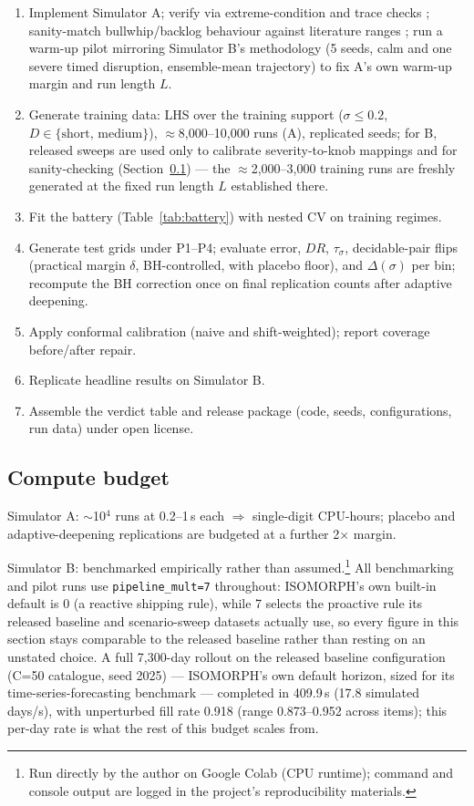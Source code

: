 \documentclass[12pt,a4paper]{article}
\begin{document}
\begin{enumerate}
\item Implement Simulator A; verify via extreme-condition and trace checks \citep{law2015}; sanity-match bullwhip/backlog behaviour against literature ranges \citep{lee1997}; run a warm-up pilot mirroring Simulator B's methodology (5 seeds, calm and one severe timed disruption, ensemble-mean trajectory) to fix A's own warm-up margin and run length $L$.
\item Generate training data: LHS over the training support ($\sigma \leq 0.2$, $D \in \{\text{short, medium}\}$), $\approx$8{,}000--10{,}000 runs (A), replicated seeds; for B, released sweeps are used only to calibrate severity-to-knob mappings and for sanity-checking (Section~\ref{sec:compute}) --- the $\approx$2{,}000--3{,}000 training runs are freshly generated at the fixed run length $L$ established there.
\item Fit the battery (Table~\ref{tab:battery}) with nested CV on training regimes.
\item Generate test grids under P1--P4; evaluate error, $DR$, $\tau_\sigma$, decidable-pair flips (practical margin $\delta$, BH-controlled, with placebo floor), and $\Delta(\sigma)$ per bin; recompute the BH correction once on final replication counts after adaptive deepening.
\item Apply conformal calibration (naive and shift-weighted); report coverage before/after repair.
\item Replicate headline results on Simulator B.
\item Assemble the verdict table and release package (code, seeds, configurations, run data) under open license.
\end{enumerate}

\subsection{Compute budget}\label{sec:compute}

Simulator A: $\sim$10$^4$ runs at 0.2--1\,s each $\Rightarrow$ single-digit CPU-hours; placebo and adaptive-deepening replications are budgeted at a further 2$\times$ margin.

Simulator B: benchmarked empirically rather than assumed.\footnote{Run directly by the author on Google Colab (CPU runtime); command and console output are logged in the project's reproducibility materials.} All benchmarking and pilot runs use \texttt{pipeline\_mult=7} throughout: ISOMORPH's own built-in default is 0 (a reactive shipping rule), while 7 selects the proactive rule its released baseline and scenario-sweep datasets actually use, so every figure in this section stays comparable to the released baseline rather than resting on an unstated choice. A full 7{,}300-day rollout on the released baseline configuration (C=50 catalogue, seed 2025) --- ISOMORPH's own default horizon, sized for its time-series-forecasting benchmark --- completed in 409.9\,s (17.8 simulated days/s), with unperturbed fill rate 0.918 (range 0.873--0.952 across items); this per-day rate is what the rest of this budget scales from.
\end{document}
